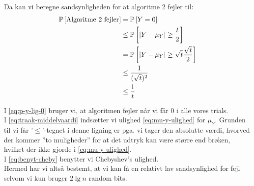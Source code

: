 Da kan vi beregne sandsynligheden for at algoritme 2 fejler til:
\begin{align}
  \P{\text{Algoritme 2 fejler}} &= \P{Y = 0} \label{eq:p-y-lig-0} \\
  &\leq \P{| Y - \mu_Y| \geq \frac{t}{2}} \label{eq:traak-middelvaardi} \\
  &= \P{|Y - \mu_Y| \geq \sqrt{t} \frac{\sqrt{t}}{2}} \nonumber \\
  &\leq \frac{1}{(\sqrt{t})^2} \label{eq:benyt-cheby}\\
  &\leq \frac{1}{t} \nonumber
\end{align}

I \cref{eq:p-y-lig-0} bruger vi, at algoritmen fejler når vi får 0 i alle vores trials.\\
I \cref{eq:traak-middelvaardi} indsætter vi ulighed \cref{eq:mu-y-ulighed} for $\mu_Y$. Grunden til vi får '$\leq$'-tegnet i denne ligning er pga. vi tager den absolutte værdi, hvorved der kommer ''to muligheder'' for at det udtryk kan være større end brøken, hvilket der ikke gjorde i \cref{eq:mu-y-ulighed}.\\
I \cref{eq:benyt-cheby} benytter vi Chebyshev's ulighed.\\

Hermed har vi altså bestemt, at vi kan få en relativt lav sandsynlighed for fejl selvom vi kun bruger $2 \lg n$ random bits.
